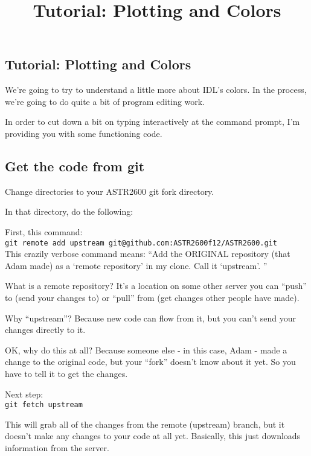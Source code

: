 \documentclass{article}
\title{Tutorial: Plotting and Colors}
\date{}
\begin{document}
\begin{spacing}{1.0}



\section{Tutorial: Plotting and Colors}

We're going to try to understand a little more about IDL's colors.  In the
process, we're going to do quite a bit of program editing work.

In order to cut down a bit on typing interactively at the command prompt,
I'm providing you with some functioning code.

\subsection{Get the code from git}

Change directories to your ASTR2600 git fork directory.

In that directory, do the following:

First, this command:\\
\verb|git remote add upstream git@github.com:ASTR2600f12/ASTR2600.git| \\
This crazily verbose command means:
``Add the ORIGINAL repository (that Adam made) as a `remote repository' in
my clone.  Call it `upstream'. ''

What is a remote repository?  It's a location on some other server you can
``push'' to (send your changes to) or ``pull'' from (get changes other people
have made).  

Why ``upstream''?  Because new code can flow from it, but you can't send your
changes directly to it.  

OK, why do this at all?  Because someone else - in this case, Adam - made a 
change to the original code, but your ``fork'' doesn't know about it yet.  So
you have to tell it to get the changes.

Next step:\\
\verb|git fetch upstream|

This will grab all of the changes from the remote (upstream) branch, but it
doesn't make any changes to your code at all yet.  Basically, this just
downloads information from the server.


\end{spacing}
\end{document}
